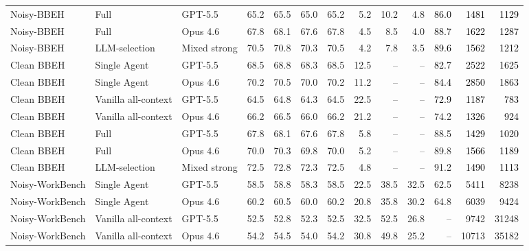 \begin{longtable}{lllrrrrrrrrrr}
Noisy-BBEH & \method{} Full & GPT-5.5 & 65.2 & 65.5 & 65.0 & 65.2 & 5.2 & 10.2 & 4.8 & \textcolor{black}{86.0} & \textcolor{black}{1481} & \textcolor{black}{1129} \\
\rowcolor{tracesoft}
Noisy-BBEH & \method{} Full & Opus 4.6 & 67.8 & 68.1 & 67.6 & 67.8 & 4.5 & 8.5 & 4.0 & \textcolor{black}{88.7} & \textcolor{black}{1622} & \textcolor{black}{1287} \\
\rowcolor{tracesoft}
Noisy-BBEH & \method{} LLM-selection & Mixed strong & 70.5 & 70.8 & 70.3 & 70.5 & 4.2 & 7.8 & 3.5 & \textcolor{black}{89.6} & \textcolor{black}{1562} & \textcolor{black}{1212} \\
\midrule
Clean BBEH & Single Agent & GPT-5.5 & 68.5 & 68.8 & 68.3 & 68.5 & 12.5 & -- & -- & \textcolor{black}{82.7} & \textcolor{black}{2522} & \textcolor{black}{1625} \\
Clean BBEH & Single Agent & Opus 4.6 & 70.2 & 70.5 & 70.0 & 70.2 & 11.2 & -- & -- & \textcolor{black}{84.4} & \textcolor{black}{2850} & \textcolor{black}{1863} \\
Clean BBEH & Vanilla all-context & GPT-5.5 & 64.5 & 64.8 & 64.3 & 64.5 & 22.5 & -- & -- & \textcolor{black}{72.9} & \textcolor{black}{1187} & \textcolor{black}{783} \\
Clean BBEH & Vanilla all-context & Opus 4.6 & 66.2 & 66.5 & 66.0 & 66.2 & 21.2 & -- & -- & 74.2 & \textcolor{black}{1326} & \textcolor{black}{924} \\
Clean BBEH & \method{} Full & GPT-5.5 & 67.8 & 68.1 & 67.6 & 67.8 & 5.8 & -- & -- & 88.5 & \textcolor{black}{1429} & \textcolor{black}{1020} \\
Clean BBEH & \method{} Full & Opus 4.6 & 70.0 & 70.3 & 69.8 & 70.0 & 5.2 & -- & -- & 89.8 & \textcolor{black}{1566} & \textcolor{black}{1189} \\
Clean BBEH & \method{} LLM-selection & Mixed strong & 72.5 & 72.8 & 72.3 & 72.5 & 4.8 & -- & -- & 91.2 & \textcolor{black}{1490} & \textcolor{black}{1113} \\
\midrule
Noisy-WorkBench & Single Agent & GPT-5.5 & 58.5 & 58.8 & 58.3 & 58.5 & 22.5 & 38.5 & 32.5 & 62.5 & 5411 & 8238 \\
Noisy-WorkBench & Single Agent & Opus 4.6 & 60.2 & 60.5 & 60.0 & 60.2 & 20.8 & 35.8 & 30.2 & 64.8 & 6039 & 9424 \\
Noisy-WorkBench & Vanilla all-context & GPT-5.5 & 52.5 & 52.8 & 52.3 & 52.5 & 32.5 & 52.5 & 26.8 & -- & 9742 & 31248 \\
Noisy-WorkBench & Vanilla all-context & Opus 4.6 & 54.2 & 54.5 & 54.0 & 54.2 & 30.8 & 49.8 & 25.2 & -- & 10713 & 35182 \\

\end{longtable}
